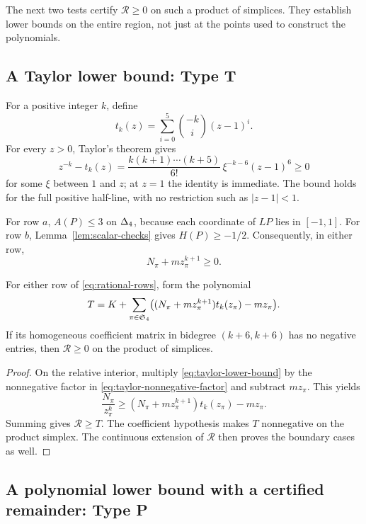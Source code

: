 The next two tests certify $\mathcal R\ge0$ on such a product of
simplices. They establish lower bounds on the entire region, not just
at the points used to construct the polynomials.

\subsection{A Taylor lower bound: Type T}

For a positive integer $k$, define
\[
 t_k(z)=\sum_{i=0}^5\binom{-k}{i}(z-1)^i.
\]
For every $z>0$, Taylor's theorem gives
\begin{equation}
 z^{-k}-t_k(z)
 =\frac{k(k+1)\cdots(k+5)}{6!}\,
   \xi^{-k-6}(z-1)^6\ge0
 \label{eq:taylor-lower-bound}
\end{equation}
for some $\xi$ between $1$ and $z$; at $z=1$ the identity is
immediate. The bound holds for the full positive half-line, with no
restriction such as $|z-1|<1$.

For row $a$, $A(P)\le3$ on $\Delta_4$, because each coordinate of
$LP$ lies in $[-1,1]$. For row $b$, Lemma~\ref{lem:scalar-checks}
gives $H(P)\ge-1/2$. Consequently, in either row,
\begin{equation}
 N_\pi+mz_\pi^{k+1}\ge0.
 \label{eq:taylor-nonnegative-factor}
\end{equation}

\begin{lemma}
\label{lem:type-t}
For either row of \eqref{eq:rational-rows}, form the polynomial
\begin{equation}
 T=K+\sum_{\pi\in\mathfrak S_4}
       \bigl((N_\pi+mz_\pi^{k+1})t_k(z_\pi)-mz_\pi\bigr).
 \label{eq:type-t-polynomial}
\end{equation}
If its homogeneous coefficient matrix in bidegree $(k+6,k+6)$
has no negative entries, then $\mathcal R\ge0$ on the product of
simplices.
\end{lemma}

\begin{proof}
On the relative interior, multiply \eqref{eq:taylor-lower-bound} by
the nonnegative factor in \eqref{eq:taylor-nonnegative-factor} and
subtract $mz_\pi$. This yields
\[
 \frac{N_\pi}{z_\pi^k}
 \ge (N_\pi+mz_\pi^{k+1})t_k(z_\pi)-mz_\pi.
\]
Summing gives $\mathcal R\ge T$. The coefficient hypothesis makes
$T$ nonnegative on the product simplex. The continuous extension of
$\mathcal R$ then proves the boundary cases as well.
\end{proof}

\subsection{A polynomial lower bound with a certified remainder: Type P}

